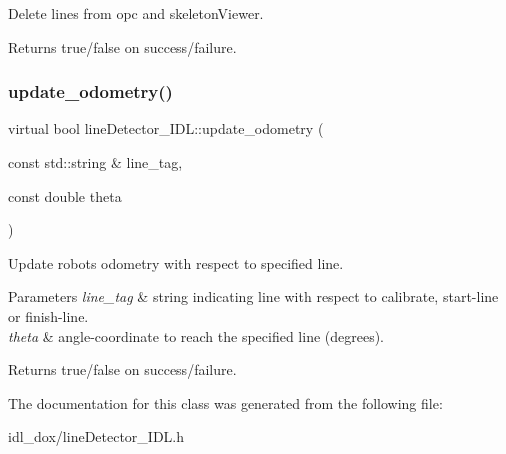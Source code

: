 Delete lines from opc and skeleton\+Viewer. 

\begin{DoxyReturn}{Returns}
true/false on success/failure. 
\end{DoxyReturn}
\mbox{\label{classlineDetector__IDL_ad4a235bdfaed101e3dd2435902347df3}} 
\subsubsection{\texorpdfstring{update\+\_\+odometry()}{update\_odometry()}}
{\footnotesize\ttfamily virtual bool line\+Detector\+\_\+\+I\+D\+L\+::update\+\_\+odometry (\begin{DoxyParamCaption}\item[{const std\+::string \&}]{line\+\_\+tag,  }\item[{const double}]{theta }\end{DoxyParamCaption})\hspace{0.3cm}{\ttfamily [virtual]}}



Update robot\textquotesingle{}s odometry with respect to specified line. 


\begin{DoxyParams}{Parameters}
{\em line\+\_\+tag} & string indicating line with respect to calibrate, start-\/line or finish-\/line. \\
\hline
{\em theta} & angle-\/coordinate to reach the specified line (degrees). \\
\hline
\end{DoxyParams}
\begin{DoxyReturn}{Returns}
true/false on success/failure. 
\end{DoxyReturn}


The documentation for this class was generated from the following file\+:\begin{DoxyCompactItemize}
\item 
idl\+\_\+dox/line\+Detector\+\_\+\+I\+D\+L.\+h\end{DoxyCompactItemize}
